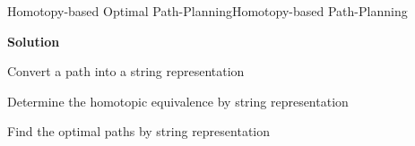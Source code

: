 \begin{frame}{Homotopy-based Optimal Path-Planning}{Homotopy-based Path-Planning}

{\bf Solution}

\begin{block}{}
Convert a path into a string representation
\end{block}
\begin{block}{}
Determine the homotopic equivalence by string representation
\end{block}
\begin{block}{}
Find the optimal paths by string representation
\end{block}

\end{frame}

